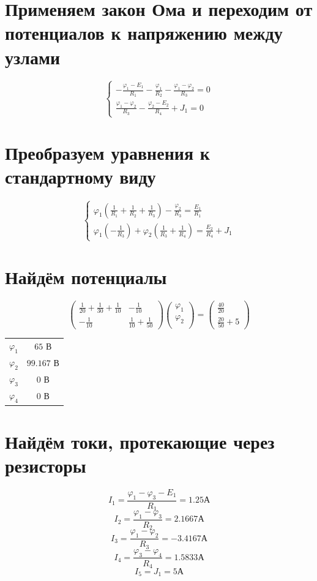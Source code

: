 \documentclass[a4paper,10pt,notitlepage,pdftex,headsepline]{scrartcl}
\begin{document}
\section{Применяем закон Ома и переходим от потенциалов к напряжению между узлами}
$$
\begin{cases}
-\frac{\varphi_1-E_1}{R_1} - \frac{\varphi_1}{R_2} - \frac{\varphi_1-\varphi_2}{R_3} = 0\\
\frac{\varphi_1-\varphi_2}{R_3} - \frac{\varphi_2-E_2}{R_4}+J_1 = 0
\end{cases}
$$
\section{Преобразуем уравнения к стандартному виду}
$$
\begin{cases}
\varphi_1 \left( \frac{1}{R_1} + \frac{1}{R_2} + \frac{1}{R_3} \right) - \frac{\varphi_2}{R_3} = \frac{E_1}{R_1}\\
\varphi_1 \left( -\frac{1}{R_3} \right) + \varphi_2 \left( \frac{1}{R_3} + \frac{1}{R_4} \right) = \frac{E_2}{R_4} + J_1
\end{cases}
$$
\section{Найдём потенциалы}
$$
\left( \begin{matrix}
\frac{1}{20} + \frac{1}{30} + \frac{1}{10} & -\frac{1}{10} \\ 
-\frac{1}{10} & \frac{1}{10} + \frac{1}{50}
\end{matrix} \right)
\left( \begin{matrix}
\varphi_1\\
\varphi_2\\
\end{matrix} \right)
=
\left( \begin{matrix}
\frac{40}{20}\\
\frac{20}{50} + 5
\end{matrix} \right)
$$

\begin{tabular}{cc}
$\varphi_1$ & $65$ В\\
$\varphi_2$ & $99.167$ В\\
$\varphi_3$ & $0$ В\\
$\varphi_4$ & $0$ В
\end{tabular}

\section{Найдём токи, протекающие через резисторы}
$$I_1 = \frac{\varphi_1 - \varphi_3 - E_1}{R_1} = 1.25 \text{А}$$
$$I_2 = \frac{\varphi_1 - \varphi_3}{R_2} = 2.1667 \text{А}$$
$$I_3 = \frac{\varphi_1 - \varphi_2}{R_3} = -3.4167 \text{А}$$
$$I_4 = \frac{\varphi_3 - \varphi_4}{R_4} = 1.5833 \text{А}$$
$$I_5 = J_1 = 5 \text{А}$$
\end{document}
